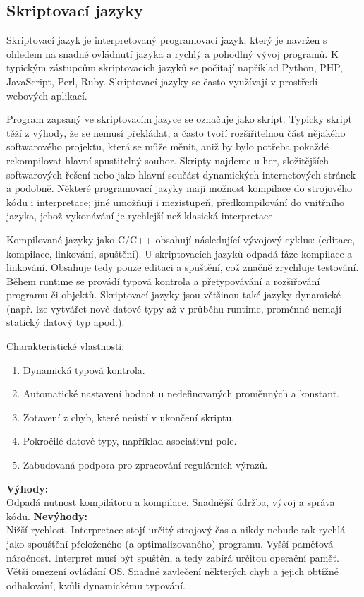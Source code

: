 \subsection{Skriptovací jazyky}
Skriptovací jazyk je interpretovaný programovací jazyk, který je navržen s ohledem na snadné ovládnutí jazyka a rychlý a pohodlný vývoj programů. K typickým zástupcům skriptovacích jazyků se počítají například Python, PHP, JavaScript, Perl, Ruby. Skriptovací jazyky se často využívají v prostředí webových aplikací.

Program zapsaný ve skriptovacím jazyce se označuje jako skript. Typicky skript těží z výhody, že se nemusí překládat, a často tvoří rozšiřitelnou část nějakého softwarového projektu, která se může měnit, aniž by bylo potřeba pokaždé rekompilovat hlavní spustitelný soubor. Skripty najdeme u her, složitějších softwarových řešení nebo jako hlavní součást dynamických internetových stránek a podobně. Některé programovací jazyky mají možnost kompilace do strojového kódu i interpretace; jiné umožňují i mezistupeň, předkompilování do vnitřního jazyka, jehož vykonávání je rychlejší než klasická interpretace.

Kompilované jazyky jako C/C++ obsahují následující vývojový cyklus: (editace, kompilace, linkování, spuštění). U skriptovacích jazyků odpadá fáze kompilace a linkování. Obsahuje tedy pouze editaci a spuštění, což značně zrychluje testování. Během runtime se provádí typová kontrola a přetypovávání a rozšiřování programu či objektů. Skriptovací jazyky jsou většinou také jazyky dynamické (např. lze vytvářet nové datové typy až v průběhu runtime, proměnné nemají statický datový typ apod.).

Charakteristické vlastnosti:
\begin{enumerate}
\item Dynamická typová kontrola.
\item Automatické nastavení hodnot u nedefinovaných proměnných a konstant.
\item Zotavení z chyb, které neústí v ukončení skriptu.
\item Pokročilé datové typy, například asociativní pole.
\item Zabudovaná podpora pro zpracování regulárních výrazů.
\end{enumerate}

\textbf{Výhody:}\\
Odpadá nutnost kompilátoru a kompilace. Snadnější údržba, vývoj a správa kódu.
\textbf{Nevýhody:}\\
Nižší rychlost. Interpretace stojí určitý strojový čas a nikdy nebude tak rychlá jako spouštění přeloženého (a optimalizovaného) programu.
Vyšší paměťová náročnost. Interpret musí být spuštěn, a tedy zabírá určitou operační paměť. Větší omezení ovládání OS.
Snadné zavlečení některých chyb a jejich obtížné odhalování, kvůli dynamickému typování.